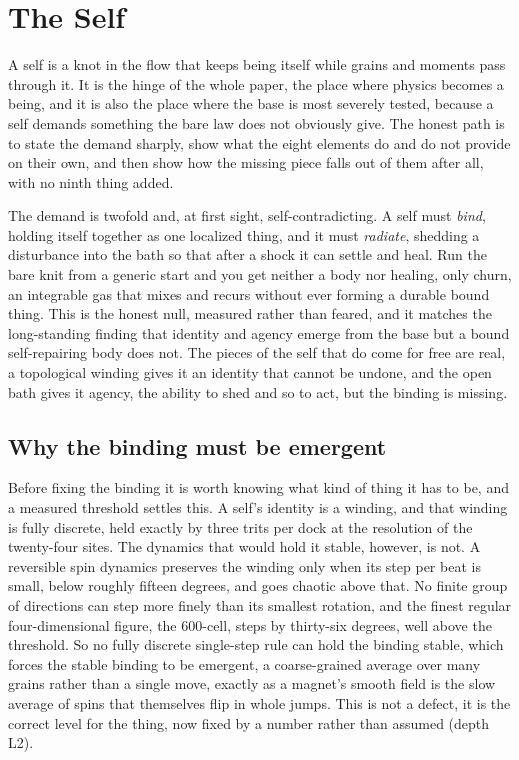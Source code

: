 \section{The Self}

A self is a knot in the flow that keeps being itself while grains and moments pass through it. It is the hinge of the whole paper, the place where physics becomes a being, and it is also the place where the base is most severely tested, because a self demands something the bare law does not obviously give. The honest path is to state the demand sharply, show what the eight elements do and do not provide on their own, and then show how the missing piece falls out of them after all, with no ninth thing added.

The demand is twofold and, at first sight, self-contradicting. A self must \emph{bind}, holding itself together as one localized thing, and it must \emph{radiate}, shedding a disturbance into the bath so that after a shock it can settle and heal. Run the bare knit from a generic start and you get neither a body nor healing, only churn, an integrable gas that mixes and recurs without ever forming a durable bound thing. This is the honest null, measured rather than feared, and it matches the long-standing finding that identity and agency emerge from the base but a bound self-repairing body does not. The pieces of the self that do come for free are real, a topological winding gives it an identity that cannot be undone, and the open bath gives it agency, the ability to shed and so to act, but the binding is missing.

\subsection{Why the binding must be emergent}

Before fixing the binding it is worth knowing what kind of thing it has to be, and a measured threshold settles this. A self's identity is a winding, and that winding is fully discrete, held exactly by three trits per dock at the resolution of the twenty-four sites. The dynamics that would hold it stable, however, is not. A reversible spin dynamics preserves the winding only when its step per beat is small, below roughly fifteen degrees, and goes chaotic above that. No finite group of directions can step more finely than its smallest rotation, and the finest regular four-dimensional figure, the $600$-cell, steps by thirty-six degrees, well above the threshold. So no fully discrete single-step rule can hold the binding stable, which forces the stable binding to be emergent, a coarse-grained average over many grains rather than a single move, exactly as a magnet's smooth field is the slow average of spins that themselves flip in whole jumps. This is not a defect, it is the correct level for the thing, now fixed by a number rather than assumed (depth L2).

